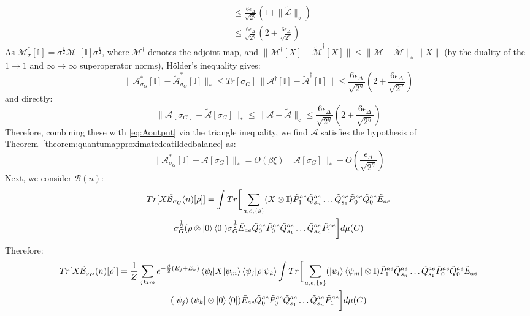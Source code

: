 \documentclass[aps,floatfix,10pt,amssymb,amsfont,amsmath,superscriptaddress,float,nofootinbib,longbibliography,nobalancelastpage,twocolumn]{revtex4-2}
\begin{document}
\begin{widetext}
\begin{align}
    &\leq \frac{6\epsilon_{\Delta}}{\sqrt{2^{\eta}}}(1+\|\tilde{\mathcal{L}}\|_{\diamond})\\
    &\leq \frac{6\epsilon_{\Delta}}{\sqrt{2^{\eta}}}(2+\frac{6\epsilon_{\Delta}}{\sqrt{2^{\eta}}})
\end{align}
As $\mathcal{M}^*_{\sigma}[\mathbb{I}] = \sigma^{\frac{1}{2}}\mathcal{M}^{\dagger}[\mathbb{I}]\sigma^{\frac{1}{2}}$, where $\mathcal{M}^{\dagger}$ denotes the adjoint map, and $\|\mathcal{M}^{\dagger}[X] - \tilde{\mathcal{M}}^{\dagger}[X]\| \leq \|\mathcal{M}-\tilde{\mathcal{M}}\|_{\diamond}\|X\|$ (by the duality of the $1\to1$ and $\infty\to\infty$ superoperator norms), H\"older's inequality gives:
\begin{equation}
    \|\mathcal{A}^*_{\sigma_G}[\mathbb{I}] - \tilde{\mathcal{A}}^*_{\sigma_G}[\mathbb{I}]\|_* \leq Tr[\sigma_G]\,\|\mathcal{A}^{\dagger}[\mathbb{I}] - \tilde{\mathcal{A}}^{\dagger}[\mathbb{I}]\| \leq \frac{6\epsilon_{\Delta}}{\sqrt{2^{\eta}}}(2+\frac{6\epsilon_{\Delta}}{\sqrt{2^{\eta}}})
\end{equation}
and directly:
\begin{equation}
    \|\mathcal{A}[\sigma_G] - \tilde{\mathcal{A}}[\sigma_G]\|_* \leq \|\mathcal{A}-\tilde{\mathcal{A}}\|_{\diamond} \leq \frac{6\epsilon_{\Delta}}{\sqrt{2^{\eta}}}(2+\frac{6\epsilon_{\Delta}}{\sqrt{2^{\eta}}})
\end{equation}
Therefore, combining these with \eqref{eq:Aoutput} via the triangle inequality, we find $\mathcal{A}$ satisfies the hypothesis of Theorem~\ref{theorem:quantumapproximatedeatildedbalance} as:
\begin{equation}
    \|\mathcal{A}^*_{\sigma_G}[\mathbb{I}] - \mathcal{A}[\sigma_G]\|_* = O(\beta\xi)\|\mathcal{A}[\sigma_G]\|_* + O\left(\frac{\epsilon_{\Delta}}{\sqrt{2^{\eta}}}\right)
\end{equation}
Next, we consider $\tilde{\mathcal{B}}(n)$:
\begin{multline}
    Tr[X\tilde{\mathcal{B}}_{\sigma_G}(n)[\rho]] = \int Tr\bigg[ \sum_{a,e,\{s\}}(X\otimes \mathbb{I})\tilde P^{ae}_1\tilde Q^{ae}_{s_n}\ldots \tilde Q^{ae}_{s_1}\tilde P^{ae}_0\tilde Q^{ae}_0\tilde E_{ae} \\\sigma_G^{\frac{1}{2}}(\rho\otimes \ket{0}\bra{0})\sigma_G^{\frac{1}{2}}  \tilde E_{ae}\tilde Q^{ae}_0\tilde P^{ae}_0\tilde Q^{ae}_{s_1}\ldots \tilde Q^{ae}_{s_n}\tilde P^{ae}_1\bigg]d\mu(C)
\end{multline}
Therefore:
\begin{multline}
    Tr[X\tilde{\mathcal{B}}_{\sigma_G}(n)[\rho]] = \frac{1}{Z}\sum_{jklm}e^{-\frac{\beta}{2}(E_j+E_k)}\braket{\psi_l|X|\psi_m}\braket{\psi_j|\rho|\psi_k}\int Tr\bigg[ \sum_{a,e,\{s\}}(\ket{\psi_l}\bra{\psi_m}\otimes \mathbb{I})\tilde P^{ae}_1\tilde Q^{ae}_{s_n}\ldots \tilde Q^{ae}_{s_1}\tilde P^{ae}_0\tilde Q^{ae}_0\tilde E_{ae} \\(\ket{\psi_j}\bra{\psi_k}\otimes \ket{0}\bra{0})  \tilde E_{ae}\tilde Q^{ae}_0\tilde P^{ae}_0\tilde Q^{ae}_{s_1}\ldots \tilde Q^{ae}_{s_n}\tilde P^{ae}_1\bigg]d\mu(C)

\end{multline}
\end{widetext}
\end{document}
